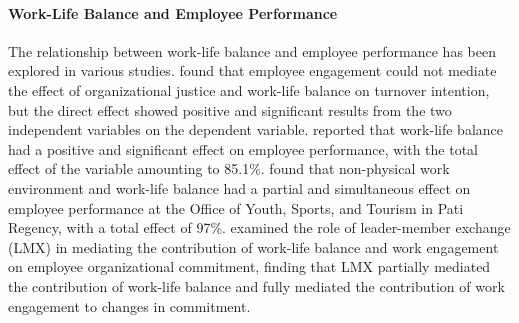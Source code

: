 \paragraph{Work-Life Balance and Employee Performance}
The relationship between work-life balance and employee performance has been explored in various studies. \citet{mulang2022analysis} found that employee engagement could not mediate the effect of organizational justice and work-life balance on turnover intention, but the direct effect showed positive and significant results from the two independent variables on the dependent variable. \citet{arifin2022pengaruh} reported that work-life balance had a positive and significant effect on employee performance, with the total effect of the variable amounting to 85.1\%. \citet{alsyah2022pengaruh} found that non-physical work environment and work-life balance had a partial and simultaneous effect on employee performance at the Office of Youth, Sports, and Tourism in Pati Regency, with a total effect of 97\%. \citet{fardiani2022the} examined the role of leader-member exchange (LMX) in mediating the contribution of work-life balance and work engagement on employee organizational commitment, finding that LMX partially mediated the contribution of work-life balance and fully mediated the contribution of work engagement to changes in commitment.